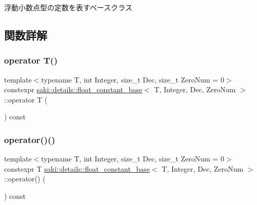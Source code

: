 浮動小数点型の定数を表すベースクラス 

\subsection{関数詳解}
\mbox{\label{structsaki_1_1details_1_1float__constant__base_a35b0e1f79344dc7f1dff6ed2b6209c7d}} 
\subsubsection{\texorpdfstring{operator T()}{operator T()}}
{\footnotesize\ttfamily template$<$typename T, int Integer, size\+\_\+t Dec, size\+\_\+t Zero\+Num = 0$>$ \\
constexpr \mbox{\hyperlink{structsaki_1_1details_1_1float__constant__base}{saki\+::details\+::float\+\_\+constant\+\_\+base}}$<$ T, Integer, Dec, Zero\+Num $>$\+::operator T (\begin{DoxyParamCaption}{ }\end{DoxyParamCaption}) const\hspace{0.3cm}{\ttfamily [inline]}}

\mbox{\label{structsaki_1_1details_1_1float__constant__base_a914139c26ddf5f9664b381a51e6423d4}} 
\subsubsection{\texorpdfstring{operator()()}{operator()()}}
{\footnotesize\ttfamily template$<$typename T, int Integer, size\+\_\+t Dec, size\+\_\+t Zero\+Num = 0$>$ \\
constexpr T \mbox{\hyperlink{structsaki_1_1details_1_1float__constant__base}{saki\+::details\+::float\+\_\+constant\+\_\+base}}$<$ T, Integer, Dec, Zero\+Num $>$\+::operator() (\begin{DoxyParamCaption}{ }\end{DoxyParamCaption}) const\hspace{0.3cm}{\ttfamily [inline]}}



